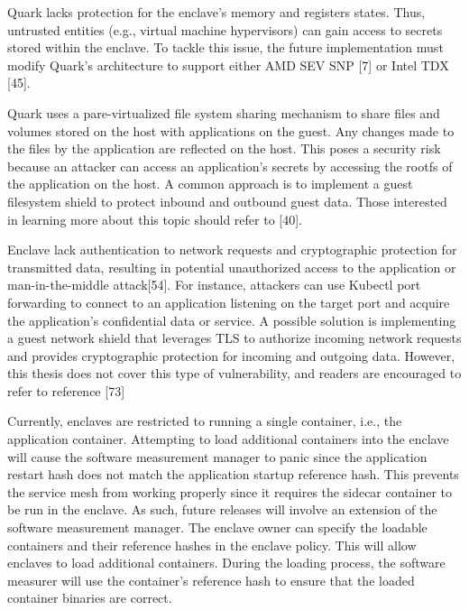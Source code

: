 Quark lacks protection for the enclave's memory and registers states. Thus, untrusted entities (e.g., virtual machine hypervisors) can gain access to secrets stored within the enclave. To tackle this issue, the future implementation must modify Quark's architecture to support either AMD SEV SNP [7] or Intel TDX [45].

Quark uses a pare-virtualized file system sharing mechanism to share files and volumes stored on the host with applications on the guest. Any changes made to the files by the application are reflected on the host. This poses a security risk because an attacker can access an application's secrets by accessing the rootfs of the application on the host. A common approach is to implement a guest filesystem shield to protect inbound and outbound guest data. Those interested in learning more about this topic should refer to [40].

Enclave lack authentication to network requests and cryptographic protection for transmitted data, resulting in potential unauthorized access to the application or man-in-the-middle attack[54]. For instance, attackers can use Kubectl port forwarding to connect to an application listening on the target port and acquire the application's confidential data or service. A possible solution is implementing a guest network shield that leverages TLS to authorize incoming network requests and provides cryptographic protection for incoming and outgoing data. However, this thesis does not cover this type of vulnerability, and readers are encouraged to refer to reference [73]

Currently, enclaves are restricted to running a single container, i.e., the application container. Attempting to load additional containers into the enclave will cause the software measurement manager to panic since the application restart hash does not match the application startup reference hash. This prevents the service mesh from working properly since it requires the sidecar container to be run in the enclave. As such,  future releases will involve an extension of the software measurement manager. The enclave owner can specify the loadable containers and their reference hashes in the enclave policy. This will allow enclaves to load additional containers. During the loading process, the software measurer will use the container's reference hash to ensure that the loaded container binaries are correct.




